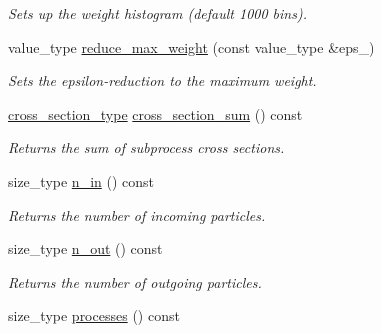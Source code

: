\begin{DoxyCompactItemize}
\begin{DoxyCompactList}\small\item\em Sets up the weight histogram (default 1000 bins). \end{DoxyCompactList}\item 
\hypertarget{a00212_a27e2b6a812ca5eee12c60a67a5718020}{}value\+\_\+type \hyperlink{a00212_a27e2b6a812ca5eee12c60a67a5718020}{reduce\+\_\+max\+\_\+weight} (const value\+\_\+type \&eps\+\_\+)\label{a00212_a27e2b6a812ca5eee12c60a67a5718020}

\begin{DoxyCompactList}\small\item\em Sets the epsilon-\/reduction to the maximum weight. \end{DoxyCompactList}\item 
\hypertarget{a00212_a593a66ef9864c32e5a0b3a1637c5c19f}{}\hyperlink{a00368}{cross\+\_\+section\+\_\+type} \hyperlink{a00212_a593a66ef9864c32e5a0b3a1637c5c19f}{cross\+\_\+section\+\_\+sum} () const \label{a00212_a593a66ef9864c32e5a0b3a1637c5c19f}

\begin{DoxyCompactList}\small\item\em Returns the sum of subprocess cross sections. \end{DoxyCompactList}\item 
\hypertarget{a00212_a7a830b9294b63b89c38d9add14b443ff}{}size\+\_\+type \hyperlink{a00212_a7a830b9294b63b89c38d9add14b443ff}{n\+\_\+in} () const \label{a00212_a7a830b9294b63b89c38d9add14b443ff}

\begin{DoxyCompactList}\small\item\em Returns the number of incoming particles. \end{DoxyCompactList}\item 
\hypertarget{a00212_aa1cafe423eddf568bd98d13ed8490a61}{}size\+\_\+type \hyperlink{a00212_aa1cafe423eddf568bd98d13ed8490a61}{n\+\_\+out} () const \label{a00212_aa1cafe423eddf568bd98d13ed8490a61}

\begin{DoxyCompactList}\small\item\em Returns the number of outgoing particles. \end{DoxyCompactList}\item 
\hypertarget{a00212_aa1c94ab0c0ae13e3276133e09bc8599a}{}size\+\_\+type \hyperlink{a00212_aa1c94ab0c0ae13e3276133e09bc8599a}{processes} () const \label{a00212_aa1c94ab0c0ae13e3276133e09bc8599a}


\end{DoxyCompactItemize}
